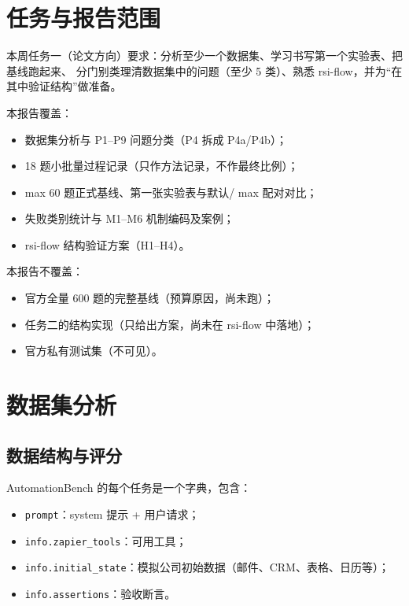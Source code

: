 \documentclass[UTF8,a4paper,11pt]{ctexart}
\begin{document}
\section{任务与报告范围}
\label{sec:scope}

本周任务一（论文方向）要求：分析至少一个数据集、学习书写第一个实验表、把基线跑起来、
分门别类理清数据集中的问题（至少 5 类）、熟悉 rsi-flow，并为“在其中验证结构”做准备。

本报告覆盖：

\begin{itemize}
  \item 数据集分析与 P1--P9 问题分类（P4 拆成 P4a/P4b）；
  \item 18 题小批量过程记录（只作方法记录，不作最终比例）；
  \item max 60 题正式基线、第一张实验表与默认/ max 配对对比；
  \item 失败类别统计与 M1--M6 机制编码及案例；
  \item rsi-flow 结构验证方案（H1--H4）。
\end{itemize}

本报告不覆盖：

\begin{itemize}
  \item 官方全量 600 题的完整基线（预算原因，尚未跑）；
  \item 任务二的结构实现（只给出方案，尚未在 rsi-flow 中落地）；
  \item 官方私有测试集（不可见）。
\end{itemize}

\section{数据集分析}
\label{sec:dataset}

\subsection{数据结构与评分}

AutomationBench 的每个任务是一个字典，包含：

\begin{itemize}
  \item \texttt{prompt}：system 提示 + 用户请求；
  \item \texttt{info.zapier\_tools}：可用工具；
  \item \texttt{info.initial\_state}：模拟公司初始数据（邮件、CRM、表格、日历等）；
  \item \texttt{info.assertions}：验收断言。
\end{itemize}
\end{document}
